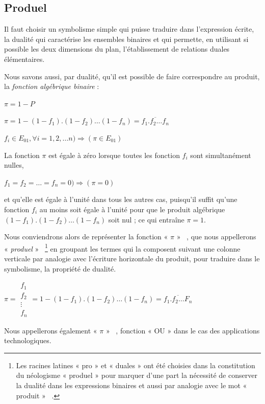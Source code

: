 \newpage 

\subsection{Produel}

Il faut choisir un symbolisme simple qui puisse traduire dans l'expression
écrite, la dualité qui caractérise les ensembles binaires et qui permette,
en utilisant si possible les deux dimensions du plan, l'établissement
de relations duales élémentaires.

Nous savons aussi, par dualité, qu'il est possible de faire correspondre
au produit, la \textit{fonction algébrique binaire} :

\centerline{$\pi=1-P$} \centerline{$\pi=1-(1-f_{1}).(1-f_{2})\ldots(1-f_{n})=\overline{f_{1}.f_{2}\ldots f_{n}}$}
\centerline{$f_{i}\in E_{01},\forall i=1,2,\ldots n)\Longrightarrow(\pi\in E_{01})$}

La fonction $\pi$ est égale à zéro lorsque toutes les fonction $f_{i}$
sont simultanément nulles,

\centerline{$f_{1}=f_{2}=\ldots=f_{n}=0)\Longrightarrow(\pi=0)$}

et qu'elle est égale à l'unité dans tous les autres cas, puisqu'il
suffit qu'une fonction $f_{i}$ au moins soit égale à l'unité pour
que le produit algébrique $(1-f_{1}).(1-f_{2})\ldots(1-f_{n})$ soit
nul ; ce qui entraîne $\pi=1$.

Nous conviendrons alors de représenter la fonction « $\pi$ » ~,
que nous appellerons « \textit{produel} » ~\footnote{Les racines latines « pro » et « duales » ont été choisies
dans la constitution du né\-o\-lo\-gisme « pro\-duel » pour
marquer d'une part la nécessité de conserver la dualité dans les expressions
binaires et aussi par analogie avec le mot « produit » ~.} en groupant les termes qui la composent suivant une colonne verticale
par analogie avec l'écriture horizontale du produit, pour traduire
dans le symbolisme, la propriété de dualité.

\begin{center}
$\pi=\begin{array}{|c|}
f_{1}\\
f_{2}\\
\vdots\\
f_{n}
\end{array}=1-(1-f_{1}).(1-f_{2})\ldots(1-f_{n})=\overline{f_{1}.f_{2}\ldots F_{n}}$
\end{center}

Nous appellerons également « $\pi$ » ~, fonction « OU »  dans
le cas des applications technologiques.

